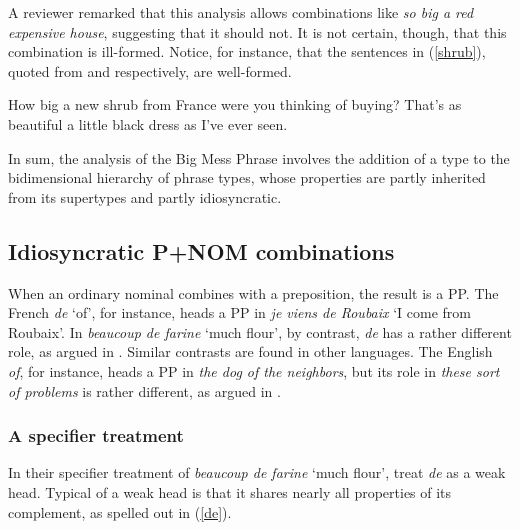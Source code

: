 \documentclass[output=paper
	        ,collection
	        ,collectionchapter
 	        ,biblatex
                ,babelshorthands
                ,newtxmath
                ,draftmode
                ,colorlinks, citecolor=brown
]{langscibook}
\begin{document}
A reviewer remarked that this analysis allows combinations like 
\emph{so big a red expensive house}, suggesting that it should not. 
It is not certain, though, that this combination is ill-formed.
Notice, for instance, that the sentences in (\ref{shrub}), 
quoted from \citet[116]{Zwicky95} and \citet[42]{Troseth09} respectively, 
are well-formed. 

\begin{exe} 
\ex\label{shrub} 
\begin{xlist} 
\ex  How big a new shrub from France were you thinking of buying? 
\ex  That's as beautiful a little black dress as I've ever seen.  
\end{xlist} 
\end{exe} 

In sum, the analysis of the Big Mess Phrase involves the addition of 
a type to the bidimensional hierarchy of phrase types, whose properties 
are partly inherited from its supertypes and partly idiosyncratic.      


\subsection{Idiosyncratic P+NOM combinations} 
\label{prep}


When an ordinary nominal combines with a preposition, the result is a PP. 
The French \emph{de} `of', for instance, heads a PP in 
\emph{je viens de Roubaix} `I come from Roubaix'. 
In \emph{beaucoup de farine} `much flour', by contrast, \emph{de} has 
a rather different role, as argued in \citet{Abeilleetal04}. 
Similar contrasts are found in other languages. The English \emph{of}, for instance, 
heads a PP in \emph{the dog of the neighbors}, but its role in \emph{these sort of problems} 
is rather different, as argued in \citet{Maekawa15}.  


\subsubsection{A specifier treatment} 


In their specifier treatment of \emph{beaucoup de farine} `much flour',  
\citet{Abeilleetal04} treat \emph{de} as a weak head. 
Typical of a weak head is that it shares 
nearly all properties of its complement, as spelled out in (\ref{de}).
\end{document}
